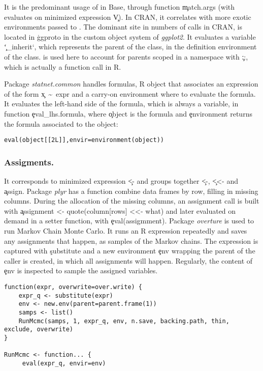 \documentclass[review,screen,acmsmall,anonymous=true]{acmart}
\begin{document}
It is the predominant usage of \eval in Base, through function \c{match.args} (with evaluates on  minimized expression \c{V}). In CRAN, it correlates with more exotic environments passed to \eval. 
The dominant site in numbers of calls in CRAN, is located in \c{ggproto} in the custom object system of \emph{ggplot2}. It evaluates a variable \c{`\_inherit`}, which represents the parent of the class, in the definition environment of the class. \eval is used here to account for parents scoped in a namespace with \c{::}, which is actually a function call in R.  


Package \emph{statnet.common} handles formulas, R object that associates an expression of the form \c{x~\textasciitilde~expr} and a carry-on environment where to evaluate the formula. It evaluates the left-hand side of the formula, which is always a variable, in function \c{eval\_lhs.formula}, where \c{object} is the formula and \c{environment} returns the formula associated to the object:

\begin{lstlisting}
eval(object[[2L]],envir=environment(object))
\end{lstlisting}

\subsubsection{Assigments.} It corresponds to minimized expression \c{<-} and groups together \c{<-}, \c{<<-} and \c{assign}. Package \emph{plyr} has a function combine data frames by row, filling in missing columns. During the allocation of the missing columns, an assignment call is built with \c{assignment <- quote(column[rows] <<- what)} and later evaluated on demand in a setter function, with \c{eval(assigmment)}. Package \emph{overture} is used to run Markov Chain Monte Carlo. It runs an R expression repeatedly and saves any assignments that happen, as samples of the Markov chains. 
The expression is captured with \c{substitute} and a new environment \c{env} wrapping the parent of the caller is created, in which all assignments will happen. Regularly, the content of \c{env} is inspected to sample the assigned variables.
\begin{lstlisting}
function(expr, overwrite=over.write) {
	expr_q <- substitute(expr)
	env <- new.env(parent=parent.frame(1))
	samps <- list()
	RunMcmc(samps, 1, expr_q, env, n.save, backing.path, thin, exclude, overwrite)
}

RunMcmc <- function... {
	 eval(expr_q, envir=env)
\end{lstlisting}
\end{document}
